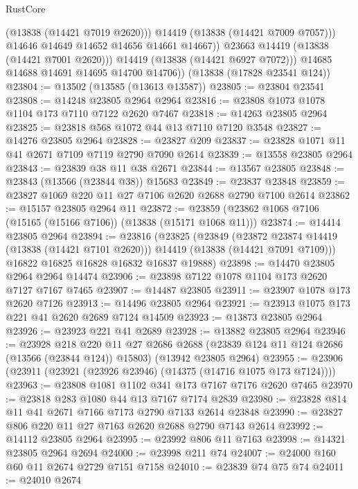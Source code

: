 \begin{lexlean}{RustCore}
\begin{coremodule}
                    (@13838 (@14421 @7019 @2620)))
                  @14419
                  (@13838 (@14421 @7009 @7057)))
                @14646
                @14649
                @14652
                @14656
                @14661
                @14667))
            @23663
            @14419
            (@13838 (@14421 @7001 @2620)))
          @14419
          (@13838 (@14421 @6927 @7072)))
        @14685
        @14688
        @14691
        @14695
        @14700
        @14706))
    (@13838 (@17828 @23541 @124))
@23804 := @13502 (@13585 (@13613 @13587))
@23805 := @23804 @23541
@23808 := @14248 @23805 @2964 @2964
@23816 := @23808 @1073 @1078 @1104 @173 @7110 @7122 @2620 @7467
@23818 := @14263 @23805 @2964
@23825 := @23818 @568 @1072 @44 @13 @7110 @7120 @3548
@23827 := @14276 @23805 @2964
@23828 := @23827 @209
@23837 := @23828 @1071 @11 @41 @2671 @7109 @7119 @2790 @7090 @2614
@23839 := @13558 @23805 @2964
@23843 := @23839 @38 @11 @38 @2671
@23844 := @13567 @23805
@23848 := @23843 (@13566 (@23844 @38)) @15683
@23849 := @23837 @23848
@23859 := @23827 @1069 @220 @11 @27 @7106 @2620 @2688 @2790 @7100 @2614
@23862 := @15157 @23805 @2964 @11
@23872 := @23859 (@23862 @1068 @7106 (@15165 (@15166 @7106)) (@13838 (@15171 @1068 @11)))
@23874 := @14414 @23805 @2964
@23894 := @23816
    (@23825
      (@23849
        (@23872 @23874 @14419 (@13838 (@14421 @7101 @2620)))
        @14419
        (@13838 (@14421 @7091 @7109)))
      @16822
      @16825
      @16828
      @16832
      @16837
      @19888)
@23898 := @14470 @23805 @2964 @2964 @14474
@23906 := @23898 @7122 @1078 @1104 @173 @2620 @7127 @7167 @7465
@23907 := @14487 @23805
@23911 := @23907 @1078 @173 @2620 @7126
@23913 := @14496 @23805 @2964
@23921 := @23913 @1075 @173 @221 @41 @2620 @2689 @7124 @14509
@23923 := @13873 @23805 @2964
@23926 := @23923 @221 @41 @2689
@23928 := @13882 @23805 @2964
@23946 := @23928
    @218
    @220
    @11
    @27
    @2686
    @2688
    (@23839 @124 @11 @124 @2686 (@13566 (@23844 @124)) @15803)
    (@13942 @23805 @2964)
@23955 := @23906 (@23911 (@23921 (@23926 @23946) (@14375 (@14716 @1075 @173 @7124))))
@23963 := @23808 @1081 @1102 @341 @173 @7167 @7176 @2620 @7465
@23970 := @23818 @283 @1080 @44 @13 @7167 @7174 @2839
@23980 := @23828 @814 @11 @41 @2671 @7166 @7173 @2790 @7133 @2614 @23848
@23990 := @23827 @806 @220 @11 @27 @7163 @2620 @2688 @2790 @7143 @2614
@23992 := @14112 @23805 @2964
@23995 := @23992 @806 @11 @7163
@23998 := @14321 @23805 @2964 @2694
@24000 := @23998 @211 @74
@24007 := @24000 @160 @60 @11 @2674 @2729 @7151 @7158
@24010 := @23839 @74 @75 @74
@24011 := @24010 @2674

\end{coremodule}
\end{lexlean}
